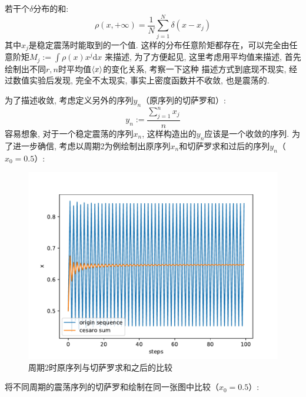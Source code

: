 \documentclass[a4paper,zihao=5,UTF8]{ctexart}
\def\d{\mathrm{d}}
\begin{document}
    若干个$\delta$分布的和:
    \begin{equation}
        \rho(x, +\infty) = \frac{1}{N}\sum_{j=1}^{N}\delta(x - x_j)
    \end{equation}
    其中$x_j$是稳定震荡时能取到的一个值. 这样的分布任意阶矩都存在，可以完全由任意阶矩$M_j := \int\rho(x)x^j\d x$
    来描述, 为了方便起见, 这里考虑用平均值来描述, 首先绘制出不同$r,n$时平均值$\braket{x}$的变化关系, 考察一下这种
    描述方式到底现不现实, 经过数值实验后发现, 完全不太现实, 事实上密度函数并不收敛, 也是震荡的. 
    \par
    为了描述收敛, 考虑定义另外的序列$y_n$（原序列的切萨罗和）:
    \begin{equation}
        y_n := \frac{\sum_{j = 1}^{n}x_j}{n}
    \end{equation}
    容易想象, 对于一个稳定震荡的序列$x_n$, 这样构造出的$y_n$应该是一个收敛的序列. 为了进一步确信, 
    考虑以周期2为例绘制出原序列$x_n$和切萨罗求和过后的序列$y_n$（$x_0 = 0.5$）:
    \begin{figure}[htbp]
        \centering
        \includegraphics[scale=0.5]{6_cesaro_p=2.pdf}
        \caption{周期2时原序列与切萨罗求和之后的比较}
    \end{figure}
    \par 
    将不同周期的震荡序列的切萨罗和绘制在同一张图中比较（$x_0 = 0.5$）:
\end{document}
